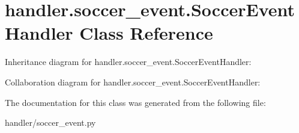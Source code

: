 \hypertarget{classhandler_1_1soccer__event_1_1_soccer_event_handler}{}\section{handler.\+soccer\+\_\+event.\+Soccer\+Event\+Handler Class Reference}
\label{classhandler_1_1soccer__event_1_1_soccer_event_handler}


Inheritance diagram for handler.\+soccer\+\_\+event.\+Soccer\+Event\+Handler\+:


Collaboration diagram for handler.\+soccer\+\_\+event.\+Soccer\+Event\+Handler\+:


The documentation for this class was generated from the following file\+:\begin{DoxyCompactItemize}
\item 
handler/soccer\+\_\+event.\+py\end{DoxyCompactItemize}
